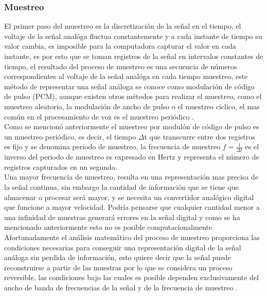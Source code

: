 \subsubsection{Muestreo}
El primer paso del muestreo es la discretizaci\'on de la señal en el tiempo, el voltaje de la señal anal\'oga fluctua constantemente y a cada instante de tiempo su valor cambia, es imposible para la computadora capturar el valor en cada instante, es por esto que se toman registros de la señal en intervalos constantes de tiempo, el resultado del proceso de muestreo es una secuencia de n\'umeros correspondientes al voltaje de la señal anal\'oga en cada tiempo muestreo, este m\'etodo de representar una señal an\'aloga se conoce como modulaci\'on de c\'odigo de pulso (PCM)\cite{dodge}, aunque existen otros m\'etodos para realizar el muestreo, como el muestreo aleatorio, la modulaci\'on de ancho de pulso o el muestreo c\'iclico, el mas com\'un en el procesamiento de voz es el muestreo peri\'odico \cite{beigi2011}. \\

Como se mencion\'o anteriormente el muestreo por modul\'on de c\'odigo de pulso es un muestreo peri\'odico, es decir, el tiempo \begin{math} \Delta \end{math}t que transcurre entre dos registros es fijo y se denomina periodo de muestreo, la frecuencia de muestreo \begin{math} f = \frac{1}{\Delta t} \end{math} es el inverso del periodo de muestreo es expresado en Hertz y representa el n\'umero de registros capturados en un segundo.\\

Una mayor frecuencia de muestreo, resulta en una representaci\'on mas precisa de la señal continua, sin embargo la cantidad de informaci\'on que se tiene que almacenar o procesar ser\'a mayor, y se necesita un convertidor anal\'ogico digital que funcione a mayor velocidad. Podr\'ia pensarse que cualquier cantidad menor a una infinidad de muestras generar\'a errores en la señal digital y como se ha mencionado anteriormente esto no es posible computacionalmente. Afortunadamente el an\'alisis matem\'atico del proceso de muestreo proporciona las condiciones necesarias para conseguir una representaci\'on digital de la señal an\'aloga sin perdida de informaci\'on, esto quiere decir que la señal puede reconstruirse a partir de las muestras por lo que se considera un proceso reversible, las condiciones bajo las cuales es posible dependen exclusivamente del ancho de banda de frecuencias de la señal y de la frecuencia de muestreo \cite{dodge}.\\ 

